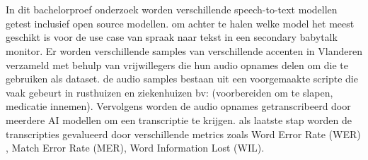
%
%
%
%
%

%



\chapter*{}

In dit bachelorproef onderzoek worden verschillende speech-to-text modellen getest inclusief open source modellen. om achter te halen welke model het meest geschikt is voor de use case van spraak naar tekst in een secondary babytalk monitor.
Er worden verschillende samples van verschillende accenten in Vlanderen verzameld met behulp van vrijwillegers die hun audio opnames delen om die te gebruiken als dataset. de audio samples bestaan uit een voorgemaakte scripte die vaak gebeurt in rusthuizen en ziekenhuizen bv: (voorbereiden om te slapen, medicatie innemen). 
Vervolgens worden de audio opnames getranscribeerd door meerdere AI modellen om een transcriptie te krijgen. als laatste stap worden de transcripties gevalueerd door verschillende metrics zoals Word Error Rate (WER) , Match Error Rate (MER), Word Information Lost (WIL). 

